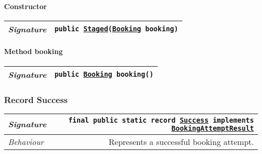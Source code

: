 \begin{adjustwidth}{1.5em}{0pt}
\begin{adjustwidth}{1.5em}{0pt}
\begin{adjustwidth}{1.5em}{0pt}
{\begin{tabularx}{1.0\linewidth}{@{}l R@{}}
      \end{tabularx}}\paragraph{Constructor\label{edu.kit.hci.soli.dto.BookingAttemptResult.Staged@edu.kit.hci.soli.dto.BookingAttemptResult.Staged(edu.kit.hci.soli.domain.Booking)}}
      \begin{adjustwidth}{1.5em}{0pt}
        {\begin{tabularx}{1.0\linewidth}{@{}l R@{}}
          \emph{Signature} & \texttt{public \texttt{\hyperref[edu.kit.hci.soli.dto.BookingAttemptResult.Staged]{\texttt{Staged}}}(\texttt{\hyperref[edu.kit.hci.soli.domain.Booking]{\texttt{Booking}}} booking)} \\
          \hline
  
        \end{tabularx}}
      \end{adjustwidth}\paragraph{Method booking\label{edu.kit.hci.soli.dto.BookingAttemptResult.Staged@booking()}}
      \begin{adjustwidth}{1.5em}{0pt}
        {\begin{tabularx}{1.0\linewidth}{@{}l R@{}}
          \emph{Signature} & \texttt{public \texttt{\hyperref[edu.kit.hci.soli.domain.Booking]{\texttt{Booking}}} booking()} \\
          \hline
  
        \end{tabularx}}
      \end{adjustwidth}
    \end{adjustwidth}\subsubsection{Record Success\label{edu.kit.hci.soli.dto.BookingAttemptResult.Success} }
    \begin{adjustwidth}{1.5em}{0pt}
      {\begin{tabularx}{1.0\linewidth}{@{}l R@{}}
        \emph{Signature} & \texttt{final public static  record \texttt{\hyperref[edu.kit.hci.soli.dto.BookingAttemptResult.Success]{\texttt{Success}} implements \texttt{\hyperref[edu.kit.hci.soli.dto.BookingAttemptResult]{\texttt{BookingAttemptResult}}}}} \\
        \hline
        \emph{Behaviour} & Represents a successful booking attempt.  \\
        \hline
  

\end{tabularx}}
\end{adjustwidth}
\end{adjustwidth}
\end{adjustwidth}
